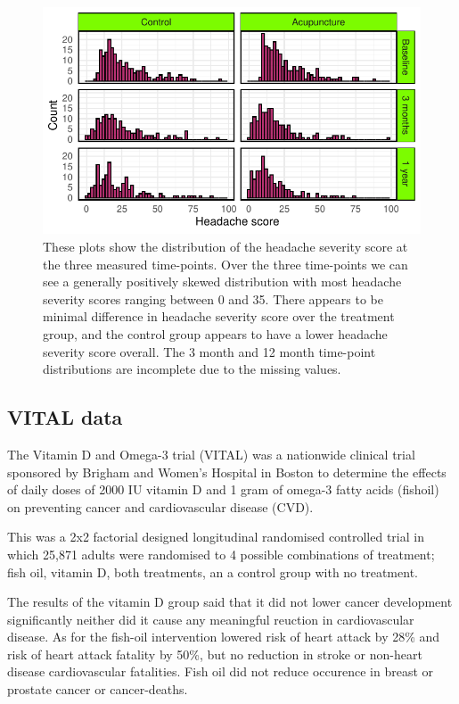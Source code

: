 \documentclass{article}
\begin{document}
\begin{figure}

{\centering \includegraphics{Final_Report_files/figure-latex/unnamed-chunk-11-1} 

}

\caption{These plots show the distribution of the headache severity score at the three measured time-points. Over the three time-points we can see a generally positively skewed distribution with most headache severity scores ranging between 0 and 35. There appears to be minimal difference in headache severity score over the treatment group, and the control group appears to have a lower headache severity score overall. The 3 month and 12 month time-point distributions are incomplete due to the missing values.}\label{fig:unnamed-chunk-11}
\end{figure}

\subsection{VITAL data}\label{vital-data}

The Vitamin D and Omega-3 trial (VITAL) was a nationwide clinical trial
sponsored by Brigham and Women's Hospital in Boston to determine the
effects of daily doses of 2000 IU vitamin D and 1 gram of omega-3 fatty
acids (fishoil) on preventing cancer and cardiovascular disease (CVD).

This was a 2x2 factorial designed longitudinal randomised controlled
trial in which 25,871 adults were randomised to 4 possible combinations
of treatment; fish oil, vitamin D, both treatments, an a control group
with no treatment.

The results of the vitamin D group said that it did not lower cancer
development significantly neither did it cause any meaningful reuction
in cardiovascular disease. As for the fish-oil intervention lowered risk
of heart attack by 28\% and risk of heart attack fatality by 50\%, but
no reduction in stroke or non-heart disease cardiovascular fatalities.
Fish oil did not reduce occurence in breast or prostate cancer or
cancer-deaths.
\end{document}
